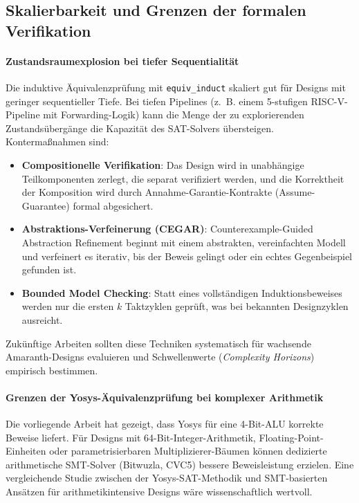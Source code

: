 ﻿\documentclass[12pt,a4paper]{report}
\begin{document}
\subsection{Skalierbarkeit und Grenzen der formalen Verifikation}

\paragraph{Zustandsraumexplosion bei tiefer Sequentialität}
Die induktive Äquivalenzprüfung mit \texttt{equiv\_induct} skaliert gut für
Designs mit geringer sequentieller Tiefe. Bei tiefen Pipelines (z.~B. einem
5-stufigen RISC-V-Pipeline mit Forwarding-Logik) kann die Menge der zu explorierenden
Zustandsübergänge die Kapazität des SAT-Solvers übersteigen. 
Kontermaßnahmen sind:
\begin{itemize}
    \item \textbf{Compositionelle Verifikation}: Das Design wird in unabhängige
          Teilkomponenten zerlegt, die separat verifiziert werden, und die Korrektheit
          der Komposition wird durch Annahme-Garantie-Kontrakte (Assume-Guarantee)
          formal abgesichert.
    \item \textbf{Abstraktions-Verfeinerung (CEGAR)}: Counterexample-Guided Abstraction
          Refinement beginnt mit einem abstrakten, vereinfachten Modell und verfeinert
          es iterativ, bis der Beweis gelingt oder ein echtes Gegenbeispiel gefunden ist.
    \item \textbf{Bounded Model Checking}: Statt eines vollständigen Induktionsbeweises
          werden nur die ersten $k$ Taktzyklen geprüft, was bei bekannten Designzyklen
          ausreicht.
\end{itemize}
Zukünftige Arbeiten sollten diese Techniken systematisch für wachsende Amaranth-Designs
evaluieren und Schwellenwerte (\textit{Complexity Horizons}) empirisch bestimmen.

\paragraph{Grenzen der Yosys-Äquivalenzprüfung bei komplexer Arithmetik}
Die vorliegende Arbeit hat gezeigt, dass Yosys für eine 4-Bit-ALU korrekte Beweise
liefert. Für Designs mit 64-Bit-Integer-Arithmetik, Floating-Point-Einheiten oder
parametrisierbaren Multiplizierer-Bäumen können dedizierte arithmetische SMT-Solver
(Bitwuzla, CVC5) bessere Beweisleistung erzielen. Eine vergleichende Studie zwischen
der Yosys-SAT-Methodik und SMT-basierten Ansätzen für arithmetikintensive Designs wäre
wissenschaftlich wertvoll.
\end{document}
